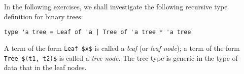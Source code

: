 In the following exercises, we shall investigate the following recursive type definition for binary trees:
\begin{lstlisting}
type 'a tree = Leaf of 'a | Tree of 'a tree * 'a tree
\end{lstlisting}
A term of the form \lstinline{Leaf $x$} is called a \emph{leaf} (or \emph{leaf node});
a term of the form \lstinline{Tree $(t1, t2)$} is called a \emph{tree node}.
The tree type is generic in the type of data that in the leaf nodes.